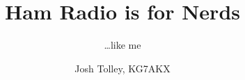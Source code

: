



\title{Ham Radio is for Nerds}
\subtitle{\ldots like me}
\author{Josh Tolley, KG7AKX}

{
    \begin{frame} 
        \titlepage 
    \end{frame} 
} 



